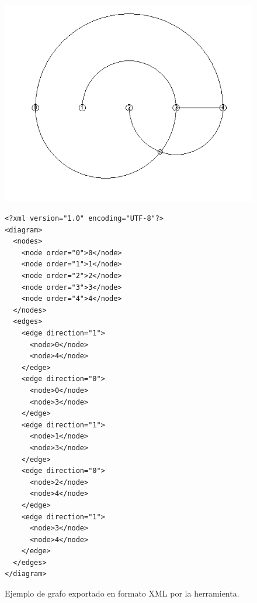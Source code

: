 \begin{figure}

	\centering
	\includegraphics[width=15cm]{imagenes/ejemplo_xml.png}
	\begin{multicols}{2}
\begin{verbatim}
<?xml version="1.0" encoding="UTF-8"?>
<diagram>
  <nodes>
    <node order="0">0</node>
    <node order="1">1</node>
    <node order="2">2</node>
    <node order="3">3</node>
    <node order="4">4</node>
  </nodes>
  <edges>
    <edge direction="1">
      <node>0</node>
      <node>4</node>
    </edge>
    <edge direction="0">
      <node>0</node>
      <node>3</node>
    </edge>
    <edge direction="1">
      <node>1</node>
      <node>3</node>
    </edge>
    <edge direction="0">
      <node>2</node>
      <node>4</node>
    </edge>
    <edge direction="1">
      <node>3</node>
      <node>4</node>
    </edge>
  </edges>
</diagram>
\end{verbatim}
\end{multicols}
	\caption{Ejemplo de grafo exportado en formato XML por la herramienta.}
	\label{fig:ejemplo_xml}
\end{figure}




